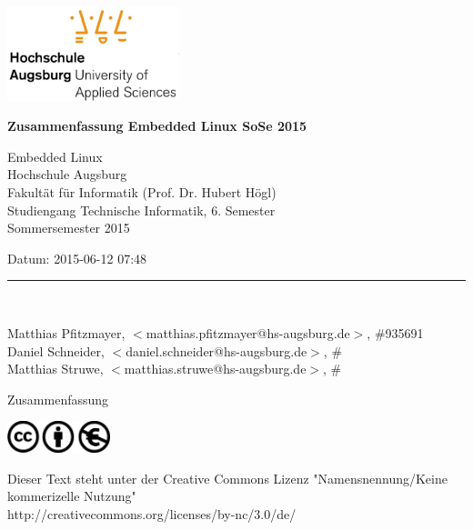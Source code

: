 




















\ \ 
\hfill
\begin{minipage}[t]{5cm}
\includegraphics[width=5cm]{img/hsa-logo.jpg}
\end{minipage}

\vskip 10mm

{\parindent=0pt

\thispagestyle{empty}


{\Large\bf Zusammenfassung Embedded Linux SoSe 2015
}

\vskip 5mm

Embedded Linux \\
Hochschule Augsburg \\
Fakultät für Informatik (Prof. Dr. Hubert Högl) \\
Studiengang Technische Informatik, 6. Semester \\

Sommersemester 2015
 

Datum: 2015-06-12 07:48 \\

\medskip

\rule{10cm}{4pt}\\

\medskip

Matthias Pfitzmayer, $<$matthias.pfitzmayer@hs-augsburg.de$>$, \#935691 \\
Daniel Schneider, $<$daniel.schneider@hs-augsburg.de$>$, \# \\
Matthias Struwe, $<$matthias.struwe@hs-augsburg.de$>$, \# \\


\vskip 2cm

\begin{center}
{\LARGE\bf

Zusammenfassung

}
\end{center}

\vfill

\begin{minipage}[t]{3cm}
\includegraphics[width=3cm]{img/cc-logo.jpg}
\end{minipage}

{\small
Dieser Text steht unter der Creative Commons Lizenz "Namensnennung/Keine kommerizelle Nutzung"\\
http://creativecommons.org/licenses/by-nc/3.0/de/
}

} %


\newpage
